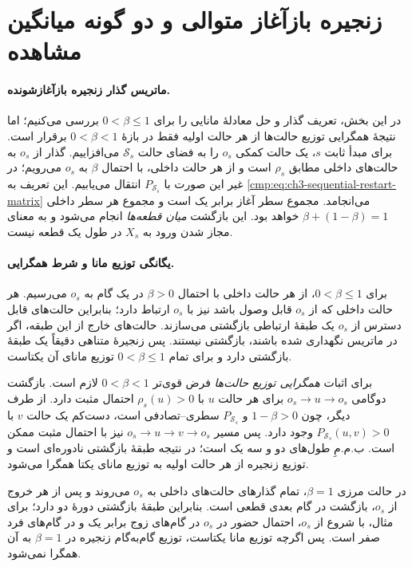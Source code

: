 \section{زنجیره بازآغاز متوالی و دو گونه میانگین مشاهده}
\label{app:ch3-policy-center-sequential-restart}

\paragraph{ماتریس گذار زنجیره بازآغازشونده.}
در این بخش، تعریف گذار و حل معادلهٔ مانایی را برای
$0<\beta\le1$ بررسی می‌کنیم؛ اما نتیجهٔ همگرایی
توزیع حالت‌ها از هر حالت اولیه فقط در بازهٔ
$0<\beta<1$ برقرار است.
برای مبدأ ثابت $s$،
یک حالت کمکی $o_s$
را به فضای حالت
$\mathcal S_s$ می‌افزاییم.
گذار از $o_s$ به
حالت‌های داخلی مطابق
$\rho_s$ است و
از هر حالت داخلی،
با احتمال $\beta$
به $o_s$ می‌رویم؛
در غیر این صورت
با $P_{\mathcal S_s}$
انتقال می‌یابیم.
این تعریف به
\eqref{cmp:eq:ch3-sequential-restart-matrix}
می‌انجامد.
مجموع سطر آغاز
برابر یک است و
مجموع هر سطر داخلی
$\beta+(1-\beta)=1$
خواهد بود.
این بازگشت
\emph{میان قطعه‌ها}
انجام می‌شود
و به معنای
مجاز شدن ورود
به $X_s$ در
طول یک قطعه
نیست.

\paragraph{یگانگی توزیع مانا و شرط همگرایی.}
برای $0<\beta\le1$،
از هر حالت داخلی با
احتمال $\beta>0$
در یک گام به $o_s$
می‌رسیم. هر حالت داخلی
که از $o_s$ قابل وصول
باشد نیز با $o_s$
ارتباط دارد؛ بنابراین
حالت‌های قابل دسترس
از $o_s$ یک طبقهٔ
ارتباطی بازگشتی می‌سازند.
حالت‌های خارج از این
طبقه، اگر در ماتریس
نگهداری شده باشند،
بازگشتی نیستند.
پس زنجیرهٔ متناهی
دقیقاً یک طبقهٔ
بازگشتی دارد و برای
تمام $0<\beta\le1$
توزیع مانای آن یکتاست.

برای اثبات \emph{همگرایی توزیع حالت‌ها}
فرض قوی‌تر $0<\beta<1$
لازم است. بازگشت دوگامی
$o_s\to u\to o_s$
برای هر حالت $u$
با $\rho_s(u)>0$
احتمال مثبت دارد.
از طرف دیگر، چون
$1-\beta>0$ و
$P_{\mathcal S_s}$ سطری--تصادفی است،
دست‌کم یک حالت $v$
با $P_{\mathcal S_s}(u,v)>0$
وجود دارد. پس مسیر
$o_s\to u\to v\to o_s$
نیز با احتمال مثبت
ممکن است. ب.م.مِ
طول‌های دو و سه یک
است؛ در نتیجه طبقهٔ
بازگشتی نادوره‌ای است
و توزیع زنجیره از هر
حالت اولیه به توزیع
مانای یکتا همگرا می‌شود.

در حالت مرزی $\beta=1$،
تمام گذارهای حالت‌های
داخلی به $o_s$ می‌روند
و پس از هر خروج از
$o_s$، بازگشت در گام
بعدی قطعی است. بنابراین
طبقهٔ بازگشتی دورهٔ دو
دارد؛ برای مثال، با
شروع از $o_s$، احتمال
حضور در $o_s$ در
گام‌های زوج برابر یک
و در گام‌های فرد صفر
است. پس اگرچه توزیع
مانا یکتاست، توزیع
گام‌به‌گام زنجیره
در $\beta=1$ به آن
همگرا نمی‌شود.

